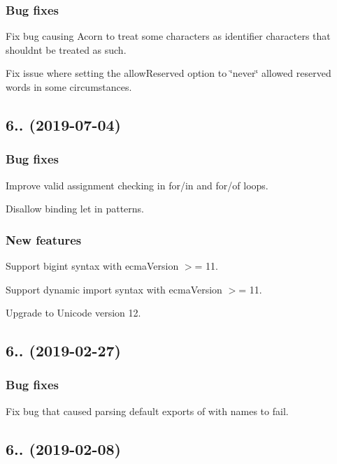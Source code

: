 \subsubsection*{Bug fixes}

Fix bug causing Acorn to treat some characters as identifier characters that shouldn\textquotesingle{}t be treated as such.

Fix issue where setting the {\ttfamily allow\+Reserved} option to {\ttfamily \char`\"{}never\char`\"{}} allowed reserved words in some circumstances.

\subsection*{6.. (2019-\/07-\/04)}

\subsubsection*{Bug fixes}

Improve valid assignment checking in {\ttfamily for}/{\ttfamily in} and {\ttfamily for}/{\ttfamily of} loops.

Disallow binding {\ttfamily let} in patterns.

\subsubsection*{New features}

Support bigint syntax with {\ttfamily ecma\+Version} $>$= 11.

Support dynamic {\ttfamily import} syntax with {\ttfamily ecma\+Version} $>$= 11.

Upgrade to Unicode version 12.

\subsection*{6.. (2019-\/02-\/27)}

\subsubsection*{Bug fixes}

Fix bug that caused parsing default exports of with names to fail.

\subsection*{6.. (2019-\/02-\/08)}

